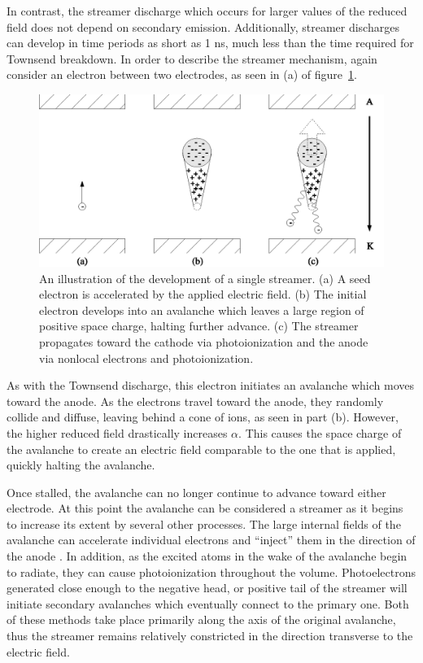 In contrast, the streamer discharge which occurs for larger values of the
reduced field does not depend on secondary emission. Additionally, streamer
discharges can develop in time periods as short as 1 ns, much less than the time
required for Townsend breakdown. In order to describe the streamer mechanism,
again consider an electron between two electrodes, as seen in (a) of
figure~\ref{fig:streamer}.
\begin{figure}
  \centering
  \includegraphics{./chapters/theory/figures/streamer.eps}
  \caption{An illustration of the development of a single streamer. (a)
    A seed electron is accelerated by the applied electric field. (b) The
    initial electron develops into an avalanche which leaves a large region
    of positive space charge, halting further advance. (c) The streamer
    propagates toward the cathode via photoionization and the anode via
    nonlocal electrons and photoionization.}
  \label{fig:streamer}
\end{figure}
As with the Townsend discharge, this electron initiates an avalanche which moves
toward the anode. As the electrons travel toward the anode, they randomly
collide and diffuse, leaving behind a cone of ions, as seen in part (b).
However, the higher reduced field drastically increases $\alpha$. This causes
the space charge of the avalanche to create an electric field comparable to the
one that is applied, quickly halting the avalanche.

Once stalled, the avalanche can no longer continue to advance toward either
electrode. At this point the avalanche can be considered a streamer as it begins
to increase its extent by several other processes. The large internal fields of
the avalanche can accelerate individual electrons and ``inject'' them in the
direction of the anode \cite{Kunhardt1980}. In addition, as the excited atoms in
the wake of the avalanche begin to radiate, they can cause photoionization
throughout the volume. Photoelectrons generated close enough to the negative
head, or positive tail of the streamer will initiate secondary avalanches which
eventually connect to the primary one. Both of these methods take place
primarily along the axis of the original avalanche, thus the streamer remains
relatively constricted in the direction transverse to the electric field.

